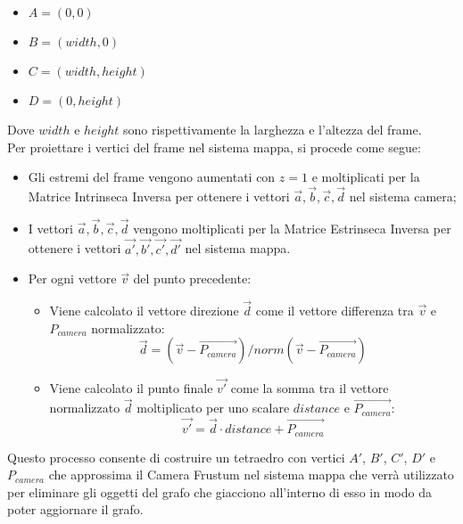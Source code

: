 \begin{itemize}
	\item $A = (0, 0)$
	\item $B = (width, 0)$
	\item $C = (width, height)$
	\item $D = (0, height)$
\end{itemize}
Dove $width$ e $height$ sono rispettivamente la larghezza e l'altezza del frame.\\
Per proiettare i vertici del frame nel sistema mappa, si procede come segue:
\begin{itemize}
	\item Gli estremi del frame vengono aumentati con $z=1$ e moltiplicati per la Matrice Intrinseca Inversa per ottenere i vettori $\vec{a}, \vec{b}, \vec{c}, \vec{d}$ nel sistema camera;
	\item I vettori $\vec{a}, \vec{b}, \vec{c}, \vec{d}$ vengono moltiplicati per la Matrice Estrinseca Inversa per ottenere i vettori $\vec{a'}, \vec{b'}, \vec{c'}, \vec{d'}$ nel sistema mappa.
	\item Per ogni vettore $\vec{v}$ del punto precedente:
	      \begin{itemize}
		      \item Viene calcolato il vettore direzione $\vec{d}$ come il vettore differenza tra $\vec{v}$ e $P_{camera}$ normalizzato:
		            \begin{equation}
			            \vec{d} = (\vec{v} - \overrightarrow{P_{camera}})/norm(\vec{v} - \overrightarrow{P_{camera}})
		            \end{equation}
		      \item Viene calcolato il punto finale $\vec{v'}$ come la somma tra il vettore normalizzato $\vec{d}$ moltiplicato per uno scalare $distance$ e $\overrightarrow{P_{camera}}$:
		            \begin{equation}
			            \vec{v'} = \vec{d} \cdot distance + \overrightarrow{P_{camera}}
		            \end{equation}
	      \end{itemize}
\end{itemize}
Questo processo consente di costruire un tetraedro con vertici $A'$, $B'$, $C'$, $D'$ e $P_{camera}$ che approssima il Camera Frustum nel sistema mappa che verrà utilizzato per eliminare gli oggetti del grafo che giacciono all'interno di esso in modo da poter aggiornare il grafo.
